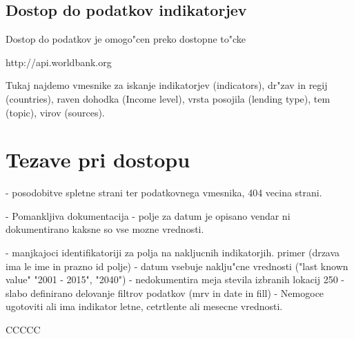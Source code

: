 \subsection{Dostop do podatkov indikatorjev}

Dostop do podatkov je omogo"cen preko dostopne to"cke

http://api.worldbank.org

Tukaj najdemo vmesnike za iskanje indikatorjev (indicators), dr"zav in regij
(countries), raven dohodka (Income level), vrsta posojila (lending type), tem
(topic), virov (sources).





\section{Tezave pri dostopu}

- posodobitve spletne strani ter podatkovnega vmesnika, 404 vecina strani.

- Pomankljiva dokumentacija
    - polje za datum je opisano vendar ni dokumentirano kaksne so vse mozne
      vrednosti. 

- manjkajoci identifikatoriji za polja na nakljucnih indikatorjih.
  primer (drzava ima le ime in prazno id polje)
- datum vsebuje naklju"cne vrednosti ("last known value" "2001 - 2015", "2040")
- nedokumentira meja stevila izbranih lokacij 250
- slabo definirano delovanje filtrov podatkov (mrv in date in fill)
- Nemogoce ugotoviti ali ima indikator letne, cetrtlente ali mesecne vrednosti.



CCCCC
